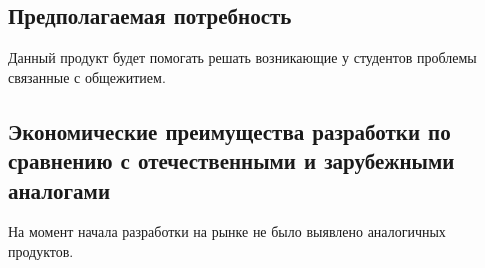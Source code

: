 \documentclass{TechDoc}
\begin{document}
    \subsection{Предполагаемая потребность}

    Данный продукт будет помогать решать возникающие у студентов проблемы связанные с общежитием.

    \subsection{Экономические преимущества разработки по сравнению с отечественными и зарубежными аналогами}

    На момент начала разработки на рынке не было выявлено аналогичных продуктов.

    \registrationList
\end{document}
